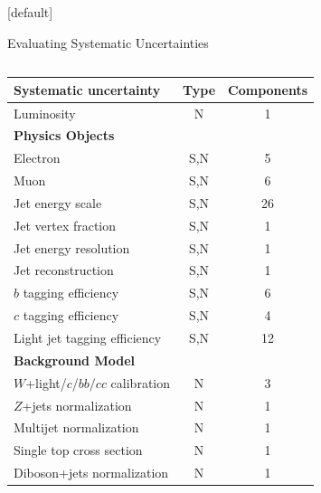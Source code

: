 \documentclass{beamer}
\begin{document}
{  \makeatletter %
  [default]
  \def\beamer@entrycode{\vspace*{-1.075\headheight}}
  \begin{frame}{Evaluating Systematic Uncertainties}
    \begin{columns}
      \begin{table}
        \begin{center}\fontsize{7}{8}\selectfont
        \begin{tabular}{lcc}
          \hline\hline
          Systematic uncertainty & Type  & Components\\
          \hline
          Luminosity                  &  N & 1\\\hline\hline
          {\bf Physics Objects}                 &   & \\
          Electron                  &  S,N & 5 \\
          Muon                      &  S,N & 6 \\\hline
          Jet energy scale            & S,N & 26\\
          Jet vertex fraction         & S,N    & 1\\
          Jet energy resolution       & S,N & 1\\
          Jet reconstruction      & S,N & 1\\ \hline
          $b$ tagging efficiency      & S,N & 6\\
          $c$ tagging efficiency      & S,N & 4\\
          Light jet tagging efficiency    & S,N & 12\\ \hline\hline
          {\bf Background Model}                 &   & \\
          $W$+light/$c$/$bb/cc$ calibration      &  N & 3\\
          $Z$+jets normalization      &  N & 1\\
          Multijet normalization      &  N & 1\\
          \hline
          Single top cross section    &  N & 1\\
          Diboson+jets normalization  &  N & 1\\ \hline\hline

\end{tabular}
\end{center}
\end{table}
\end{columns}
\end{frame}}
\end{document}
